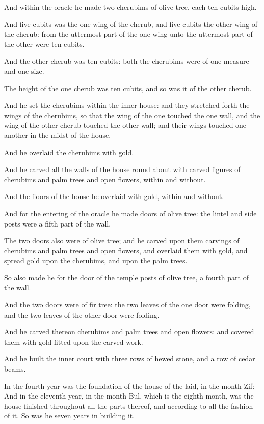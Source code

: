 \verse And within the oracle he made two cherubims of olive tree, each ten cubits high.

\verse And five cubits was the one wing of the cherub, and five cubits the other wing of the cherub: from the uttermost part of the one wing unto the uttermost part of the other were ten cubits.

\verse And the other cherub was ten cubits: both the cherubims were of one measure and one size.

\verse The height of the one cherub was ten cubits, and so was it of the other cherub.

\verse And he set the cherubims within the inner house: and they stretched forth the wings of the cherubims, so that the wing of the one touched the one wall, and the wing of the other cherub touched the other wall; and their wings touched one another in the midst of the house.

\verse And he overlaid the cherubims with gold.

\verse And he carved all the walls of the house round about with carved figures of cherubims and palm trees and open flowers, within and without.

\verse And the floors of the house he overlaid with gold, within and without.

\verse And for the entering of the oracle he made doors of olive tree: the lintel and side posts were a fifth part of the wall.

\verse The two doors also were of olive tree; and he carved upon them carvings of cherubims and palm trees and open flowers, and overlaid them with gold, and spread gold upon the cherubims, and upon the palm trees.

\verse So also made he for the door of the temple posts of olive tree, a fourth part of the wall.

\verse And the two doors were of fir tree: the two leaves of the one door were folding, and the two leaves of the other door were folding.

\verse And he carved thereon cherubims and palm trees and open flowers: and covered them with gold fitted upon the carved work.

\verse And he built the inner court with three rows of hewed stone, and a row of cedar beams.

\verse In the fourth year was the foundation of the house of the \LORD laid, in the month Zif: \verse And in the eleventh year, in the month Bul, which is the eighth month, was the house finished throughout all the parts thereof, and according to all the fashion of it. So was he seven years in building it.


